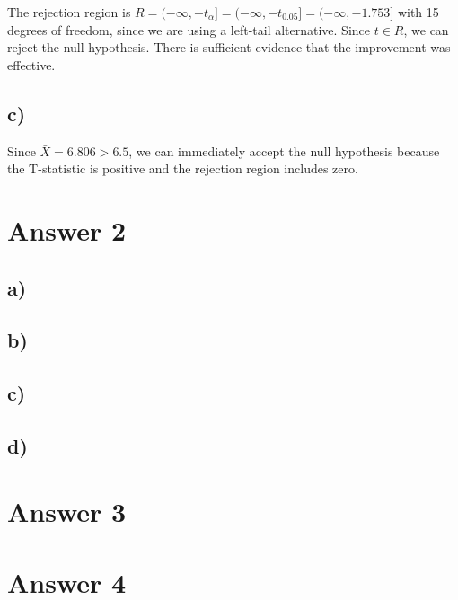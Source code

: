 \documentclass[12pt]{article}
\begin{document}
The rejection region is $R = (-\infty, -\textit{t}_{\alpha}] = (-\infty,
-\textit{t}_{0.05}] = (-\infty, -1.753]$ with 15 degrees of freedom, since we
are using a left-tail alternative. Since $t \in R$, we can reject the null
hypothesis. There is sufficient evidence that the improvement was effective.

\subsection*{c)}

Since $\bar{X} = 6.806 > 6.5$, we can immediately accept the null hypothesis because the T-statistic is positive and the rejection region includes zero.

\section*{Answer 2}
\subsection*{a)}
\subsection*{b)}
\subsection*{c)}
\subsection*{d)}


\section*{Answer 3}

\section*{Answer 4}
\end{document}
